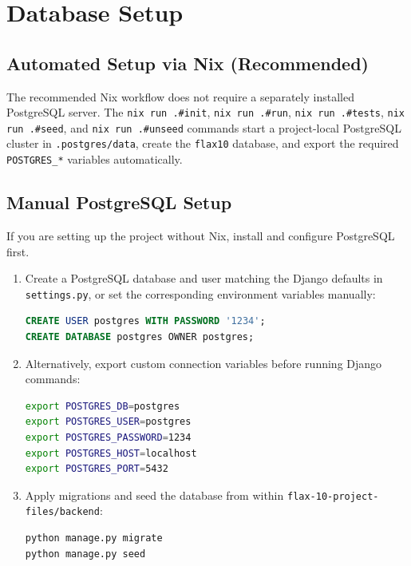 \documentclass[a4paper, 12pt]{report}
\begin{document}
\chapter{Database Setup}

\section{Automated Setup via Nix (Recommended)}

The recommended Nix workflow does not require a separately installed
PostgreSQL server. The \texttt{nix run .\#init}, \texttt{nix run .\#run},
\texttt{nix run .\#tests}, \texttt{nix run .\#seed}, and
\texttt{nix run .\#unseed} commands start a project-local PostgreSQL
cluster in \texttt{.postgres/data}, create the \texttt{flax10}
database, and export the required \texttt{POSTGRES\_*} variables
automatically.

\section{Manual PostgreSQL Setup}

If you are setting up the project without Nix, install and configure
PostgreSQL first.

\begin{enumerate}
    \item Create a PostgreSQL database and user matching the Django
          defaults in \texttt{settings.py}, or set the corresponding
          environment variables manually:
\begin{lstlisting}[language=sql]
CREATE USER postgres WITH PASSWORD '1234';
CREATE DATABASE postgres OWNER postgres;
\end{lstlisting}

    \item Alternatively, export custom connection variables before
          running Django commands:
\begin{lstlisting}[language=bash]
export POSTGRES_DB=postgres
export POSTGRES_USER=postgres
export POSTGRES_PASSWORD=1234
export POSTGRES_HOST=localhost
export POSTGRES_PORT=5432
\end{lstlisting}

    \item Apply migrations and seed the database from within
          \texttt{flax-10-project-files/backend}:
\begin{lstlisting}[language=bash]
python manage.py migrate
python manage.py seed
\end{lstlisting}
\end{enumerate}
\end{document}

